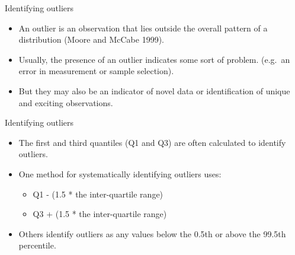 \documentclass[
  ignorenonframetext,
]{beamer}
\providecommand{\tightlist}{%
  \setlength{\itemsep}{0pt}\setlength{\parskip}{0pt}}
\begin{document}
\begin{frame}{Identifying outliers}
\label{identifying-outliers}
\begin{itemize}
\tightlist
\item
  An outlier is an observation that lies outside the overall pattern of
  a distribution (Moore and McCabe 1999).
\end{itemize}

\begin{itemize}
\tightlist
\item
  Usually, the presence of an outlier indicates some sort of problem.
  (e.g.~an error in measurement or sample selection).
\end{itemize}

\begin{itemize}
\tightlist
\item
  But they may also be an indicator of novel data or identification of
  unique and exciting observations.
\end{itemize}
\end{frame}

\begin{frame}{Identifying outliers}
\label{identifying-outliers-1}
\begin{itemize}
\tightlist
\item
  The first and third quantiles (Q1 and Q3) are often calculated to
  identify outliers.
\end{itemize}

\begin{itemize}
\tightlist
\item
  One method for systematically identifying outliers uses:

  \begin{itemize}
  \tightlist
  \item
    Q1 - (1.5 * the inter-quartile range)
  \item
    Q3 + (1.5 * the inter-quartile range)
  \end{itemize}
\end{itemize}

\begin{itemize}
\tightlist
\item
  Others identify outliers as any values below the 0.5th or above the
  99.5th percentile.
\end{itemize}
\end{frame}
\end{document}
